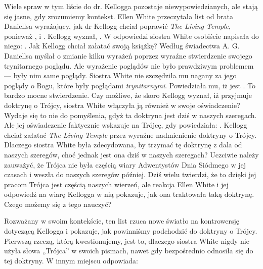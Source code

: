 Wiele spraw w tym liście do dr. Kellogga pozostaje niewypowiedzianych, ale stają się jasne, gdy zrozumiemy kontekst. Ellen White przeczytała list od brata Daniellsa wyrażający, jak dr Kellogg chciał poprawić \textit{The Living Temple}, ponieważ , i . Kellogg wyznał, . W odpowiedzi siostra White osobiście napisała do niego: . Jak Kellogg chciał załatać swoją książkę? Według świadectwa A. G. Daniellsa myślał o zmianie kilku wyrażeń poprzez wyraźne stwierdzenie swojego trynitarnego poglądu. Ale wyrażenie poglądów nie było prawdziwym problemem — były nim same poglądy. Siostra White nie szczędziła mu nagany za jego poglądy o Bogu, które były poglądami \textit{trynitarnymi}. Powiedziała mu, iż jest . To bardzo mocne stwierdzenie. Czy możliwe, że skoro Kellogg wyznał, iż przyjmuje doktrynę o Trójcy, siostra White włączyła ją również w swoje oświadczenie? Wydaje się to nie do pomyślenia, gdyż ta doktryna jest dziś w naszych szeregach. Ale jej oświadczenie faktycznie wskazuje na Trójcę, gdy powiedziała: . Kellogg chciał załatać \textit{The Living Temple} przez wyraźne nadmienienie doktryny o Trójcy. Dlaczego siostra White była zdecydowana, by trzymać tę doktrynę z dala od naszych szeregów, choć jednak jest ona dziś w naszych szeregach? Uczciwie należy zauważyć, że Trójca nie była częścią wiary Adwentystów Dnia Siódmego w jej czasach i weszła do naszych szeregów później. Dziś wielu twierdzi, że to dzięki jej pracom Trójca jest częścią naszych wierzeń, ale reakcja Ellen White i jej odpowiedź na wiarę Kellogga w nią pokazuje, jak ona traktowała taką doktrynę. Czego możemy się z tego nauczyć?

Rozważany w swoim kontekście, ten list rzuca nowe światło na kontrowersję dotyczącą Kellogga i pokazuje, jak powinniśmy podchodzić do doktryny o Trójcy. Pierwszą rzeczą, którą kwestionujemy, jest to, dlaczego siostra White nigdy nie użyła słowa „Trójca” w swoich pismach, nawet gdy bezpośrednio odnosiła się do tej doktryny. W innym miejscu odpowiada:

